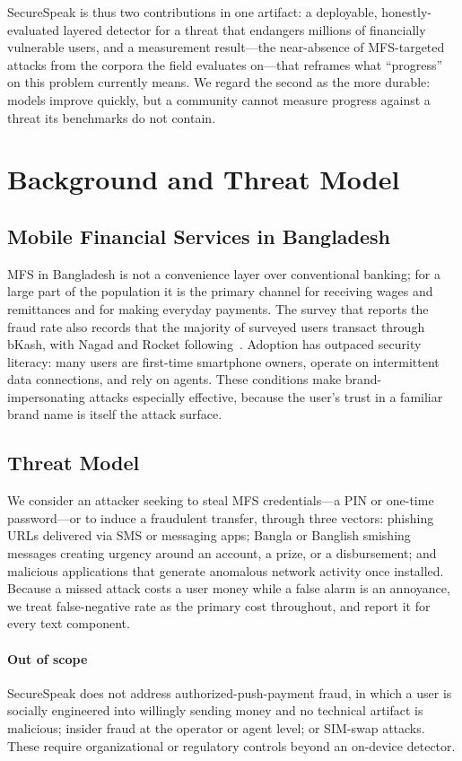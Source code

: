 \documentclass[preprint,12pt,number]{elsarticle}
\begin{document}
SecureSpeak is thus two contributions in one artifact: a deployable, honestly-evaluated layered detector for a threat that endangers millions of financially vulnerable users, and a measurement result---the near-absence of MFS-targeted attacks from the corpora the field evaluates on---that reframes what ``progress'' on this problem currently means. We regard the second as the more durable: models improve quickly, but a community cannot measure progress against a threat its benchmarks do not contain.

\section{Background and Threat Model}
\subsection{Mobile Financial Services in Bangladesh}
MFS in Bangladesh is not a convenience layer over conventional banking; for a large part of the population it is the primary channel for receiving wages and remittances and for making everyday payments. The survey that reports the fraud rate also records that the majority of surveyed users transact through bKash, with Nagad and Rocket following~\cite{pri2022}. Adoption has outpaced security literacy: many users are first-time smartphone owners, operate on intermittent data connections, and rely on agents. These conditions make brand-impersonating attacks especially effective, because the user's trust in a familiar brand name is itself the attack surface.

\subsection{Threat Model}
We consider an attacker seeking to steal MFS credentials---a PIN or one-time password---or to induce a fraudulent transfer, through three vectors: phishing URLs delivered via SMS or messaging apps; Bangla or Banglish smishing messages creating urgency around an account, a prize, or a disbursement; and malicious applications that generate anomalous network activity once installed. Because a missed attack costs a user money while a false alarm is an annoyance, we treat false-negative rate as the primary cost throughout, and report it for every text component.

\paragraph{Out of scope} SecureSpeak does not address authorized-push-payment fraud, in which a user is socially engineered into willingly sending money and no technical artifact is malicious; insider fraud at the operator or agent level; or SIM-swap attacks. These require organizational or regulatory controls beyond an on-device detector.
\end{document}
